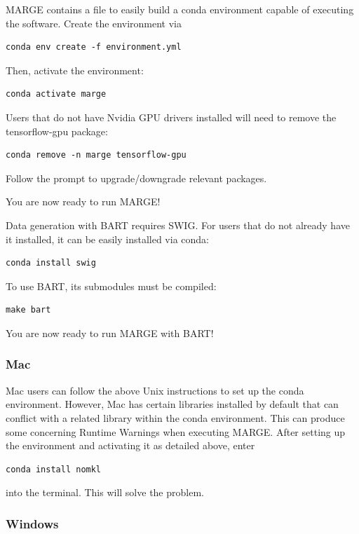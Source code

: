 \documentclass[letterpaper, 12pt]{article}
\begin{document}
\noindent MARGE contains a file to easily build a conda environment capable of 
executing the software.  Create the environment via
\begin{verbatim}
conda env create -f environment.yml
\end{verbatim}

\noindent Then, activate the environment:
\begin{verbatim}
conda activate marge
\end{verbatim}

\noindent Users that do not have Nvidia GPU drivers installed will need to 
remove the tensorflow-gpu package:
\begin{verbatim}
conda remove -n marge tensorflow-gpu
\end{verbatim}
\noindent Follow the prompt to upgrade/downgrade relevant packages.\newline

\noindent You are now ready to run MARGE!\newline

\noindent Data generation with BART requires SWIG.  For users that do not 
already have it installed, it can be easily installed via conda:
\begin{verbatim}
conda install swig
\end{verbatim}

\noindent To use BART, its submodules must be compiled:
\begin{verbatim}
make bart
\end{verbatim}

\noindent You are now ready to run MARGE with BART!


\subsubsection{Mac}

Mac users can follow the above Unix instructions to set up the conda 
environment.  However, Mac has certain libraries installed by default that 
can conflict with a related library within the conda environment.  This can 
produce some concerning Runtime Warnings when executing MARGE.  After setting 
up the environment and activating it as detailed above, enter 
\begin{verbatim}
conda install nomkl
\end{verbatim}
\noindent into the terminal.  This will solve the problem.


\subsubsection{Windows}
\end{document}
